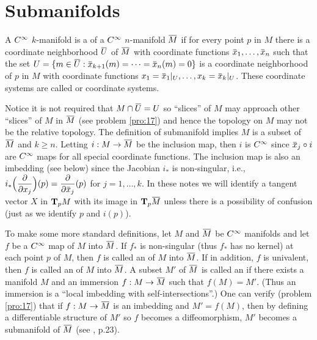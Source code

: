 \documentclass[../main]{subfiles}
\begin{document}

\section{Submanifolds}\label{ch01:s6}

A $\CInfty$ $k$-manifold is a  of a $\CInfty$ $n$-manifold $\xoverline{M}$ if for every point $p$ in $M$ there is a coordinate neighborhood $\xoverline{U}$ of $\xoverline{M}$ with coordinate functions  $\xoverline{x}_1, \dots, \xoverline{x}_n$ such that the set $U = \{m \in \xoverline{U}: \xoverline{x}_{k+1}(m) = \dots = \xoverline{x}_n(m) = 0\}$ is a coordinate neighborhood of $p$ in $M$ with coordinate functions \newline $x_1 = \xoverline{x}_1 |_{U}, \dots ,x_k = \xoverline{x}_k |_{U} $. These coordinate systems are called  or  coordinate systems. 

Notice it is not required that $M \cap \xoverline{U} = U$ so ``slices'' of $M$ may approach other ``slices'' of $M$ in $\xoverline{M}$ (see problem \ref{pro:17}) and hence the topology on $M$ may not be the relative topology. The definition of submanifold implies $M$ is a subset of $\xoverline{M}$ and $k\ge n$. Letting $i:M \functionMaps\xoverline{M}$ be the inclusion map, then $i$ is $\CInfty$ since $\xoverline{x}_j\circ i$ are $\CInfty$ maps for all special coordinate functions. The inclusion map is also an imbedding (see below) since the Jacobian $i_*$ is non-singular, i.e., $i_*\Big(\pdv{}{x_j}\Big)(p) = \pdv{}{\xoverline{x}_j}(p)$ for $j = 1,\dots,k$. In these notes we will identify a tangent vector $X$ in $\tangentspace{M}{p}$ with its image in $\tangentspace{\xoverline{M}}{p}$ unless there is a possibility of confusion (just as we identify $p$ and $i(p)$).

To make some more standard definitions, let $M$ and $\xoverline{M}$ be $\CInfty$ manifolds and let $f$ be a $\CInfty$ map of $M$ into $\xoverline{M}$. If $f_*$ is non-singular (thus $f_*$ has no kernel) at each point $p$ of $M$, then $f$ is called an  of $M$ into $\xoverline{M}$. If in addition, $f$ is univalent, then $f$ is called an  of $M$ into $\xoverline{M}$. A subset $M'$ of $\xoverline{M}$ is called an  if there exists a manifold $M$ and an immersion $f: M \functionMaps \xoverline{M}$ such that $f(M) = M'$. (Thus an immersion is a ``local imbedding with self-intersections''.) One can verify (problem \ref{pro:17}) that if $f: M \functionMaps \xoverline{M}$ is an imbedding and $M' = f(M)$, then by defining a differentiable structure of $M'$ so $f$ becomes a diffeomorphism, $M'$ becomes a submanifold of $\xoverline{M}$ (see \cite{helgason2012differential}, p.23).
\end{document}
